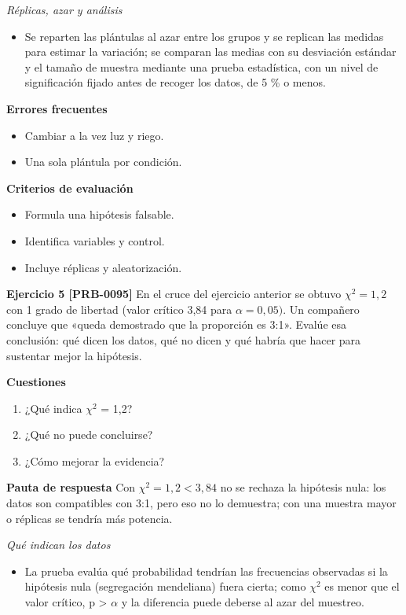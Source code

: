 \documentclass{book}
\begin{document}
\noindent\textit{Réplicas, azar y análisis}
\begin{itemize}
\item Se reparten las plántulas al azar entre los grupos y se replican las medidas para estimar la variación; se comparan las medias con su desviación estándar y el tamaño de muestra mediante una prueba estadística, con un nivel de significación fijado antes de recoger los datos, de 5 \% o menos.
\end{itemize}

\noindent\textbf{Errores frecuentes}
\begin{itemize}
\item Cambiar a la vez luz y riego.
\item Una sola plántula por condición.
\end{itemize}

\noindent\textbf{Criterios de evaluación}
\begin{itemize}
\item Formula una hipótesis falsable.
\item Identifica variables y control.
\item Incluye réplicas y aleatorización.
\end{itemize}

\noindent\textbf{Ejercicio 5 [PRB-0095]}
En el cruce del ejercicio anterior se obtuvo \(\chi^{2} = 1,2\) con 1 grado de libertad (valor crítico 3,84 para \(\alpha = 0,05)\). Un compañero concluye que «queda demostrado que la proporción es 3:1». Evalúe esa conclusión: qué dicen los datos, qué no dicen y qué habría que hacer para sustentar mejor la hipótesis.


\noindent\textbf{Cuestiones}
\begin{enumerate}
\item ¿Qué indica \(\chi^{2}\) = 1,2?
\item ¿Qué no puede concluirse?
\item ¿Cómo mejorar la evidencia?
\end{enumerate}

\noindent\textbf{Pauta de respuesta}
Con \(\chi^{2} = 1,2 < 3,84\) no se rechaza la hipótesis nula: los datos son compatibles con 3:1, pero eso no lo demuestra; con una muestra mayor o réplicas se tendría más potencia.


\noindent\textit{Qué indican los datos}
\begin{itemize}
\item La prueba evalúa qué probabilidad tendrían las frecuencias observadas si la hipótesis nula (segregación mendeliana) fuera cierta; como \(\chi^{2}\) es menor que el valor crítico, p > \(\alpha\) y la diferencia puede deberse al azar del muestreo.
\end{itemize}
\end{document}
